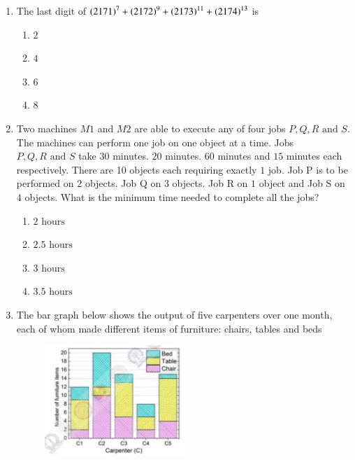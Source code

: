 \documentclass[journal]{IEEEtran}
\begin{document}
\begin{enumerate}[start=53]
    \begin{multicols}{4}
        \begin{enumerate}
            \item P
            \item Q
            \item R
            \item S
        \end{enumerate}
    \end{multicols}

    \item The last digit of $\left(2171\right)^7 + \left(2172\right)^9 + \left(2173\right)^{11} + \left(2174\right)^{13}$ is
     \begin{multicols}{4}
        \begin{enumerate}
            \item $2$
            \item $4$
            \item $6$
            \item $8$
        \end{enumerate}
    \end{multicols}
    
    \item Two machines $M1$ and $M2$ are able to execute any of four jobs $P, Q, R \text{ and } S$. The machines can perform one job on one object at a time. Jobs $P, Q, R \text{ and } S$ take $30$ minutes. $20$ minutes. $60$ minutes and $15$ minutes each respectively. There are 10 objects each requiring exactly $1$ job. Job P is to be performed on $2$ objects. Job Q on $3$ objects. Job R on $1$ object and Job S on $4$ objects. What is the minimum time needed to complete all the jobs?
    \begin{multicols}{4}
        \begin{enumerate}
            \item $2 \text{ hours}$
            \item $2.5 \text{ hours}$
            \item $3 \text{ hours}$
            \item $3.5 \text{ hours}$
        \end{enumerate}
    \end{multicols}

    \item The bar graph below shows the output of five carpenters over one month, each of whom made different items of furniture: chairs, tables and beds
    \begin{figure}[h!]
    \centering
    \includegraphics[width=0.5\textwidth]{figs/fig.png}
    \end{figure}
    

\end{enumerate}
\end{document}
